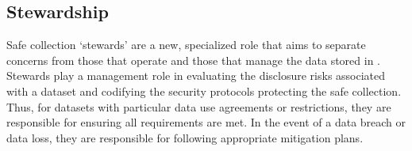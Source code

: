 %
%

\subsection{Stewardship}


Safe collection `stewards' are a new, specialized role that aims to separate
concerns from those that operate \NAME and those that manage the data stored in \NAMENS.
Stewards play a management role in evaluating the disclosure risks associated with a
dataset and codifying the security protocols protecting the safe collection.
Thus, for datasets with particular data use agreements or restrictions, they
are responsible for ensuring all requirements are met. In the event of a
data breach or data loss, they are responsible for following appropriate
mitigation plans.

